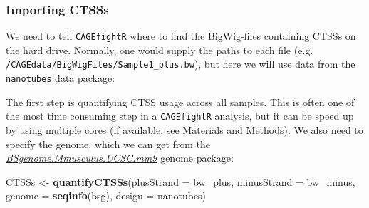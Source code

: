 \documentclass[9pt,a4paper,]{extarticle}
\newenvironment{Shaded}{\begin{snugshade}}{\end{snugshade}}
\newcommand{\KeywordTok}[1]{\textcolor[rgb]{0.13,0.29,0.53}{\textbf{{#1}}}}
\newcommand{\DataTypeTok}[1]{\textcolor[rgb]{0.13,0.29,0.53}{{#1}}}
\newcommand{\StringTok}[1]{\textcolor[rgb]{0.31,0.60,0.02}{{#1}}}
\newcommand{\CommentTok}[1]{\textcolor[rgb]{0.56,0.35,0.01}{\textit{{#1}}}}
\newcommand{\OtherTok}[1]{\textcolor[rgb]{0.56,0.35,0.01}{{#1}}}
\newcommand{\NormalTok}[1]{{#1}}
\begin{document}
\subsubsection{Importing CTSSs}\label{importing-ctsss}

We need to tell \texttt{CAGEfightR} where to find the BigWig-files containing CTSSs on the hard drive. Normally, one would supply the paths to each file (e.g. \texttt{/CAGEdata/BigWigFiles/Sample1\_plus.bw}), but here we will use data from the \texttt{nanotubes} data package:

\begin{Shaded}
\end{Shaded}

The first step is quantifying CTSS usage across all samples. This is often one of the most time consuming step in a \texttt{CAGEfightR} analysis, but it can be speed up by using multiple cores (if available, see Materials and Methods). We also need to specify the genome, which we can get from the \emph{\href{https://bioconductor.org/packages/3.8/BSgenome.Mmusculus.UCSC.mm9}{BSgenome.Mmusculus.UCSC.mm9}} genome package:

\begin{Shaded}
\begin{Highlighting}[]
\NormalTok{CTSSs <-}\StringTok{ }\KeywordTok{quantifyCTSSs}\NormalTok{(}\DataTypeTok{plusStrand =} \NormalTok{bw_plus,}
                       \DataTypeTok{minusStrand =} \NormalTok{bw_minus,}
                       \DataTypeTok{genome =} \KeywordTok{seqinfo}\NormalTok{(bsg),}
                       \DataTypeTok{design =} \NormalTok{nanotubes)}
\end{Highlighting}
\end{Shaded}
\end{document}

